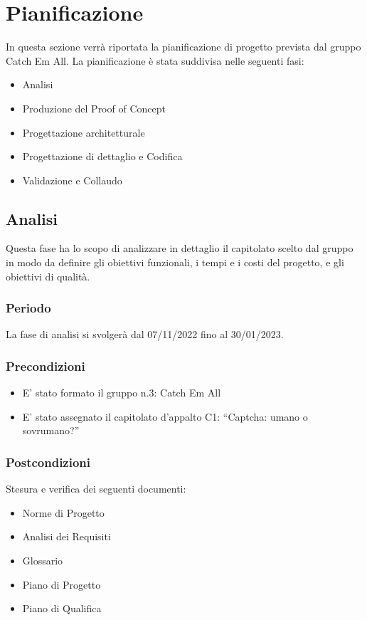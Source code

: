 \section{Pianificazione}
In questa sezione verrà riportata la pianificazione di progetto prevista dal gruppo Catch Em
All. La pianificazione è stata suddivisa nelle seguenti fasi:
\begin{itemize}
	\item Analisi
	\item Produzione del Proof of Concept
	\item Progettazione architetturale
    \item Progettazione di dettaglio e Codifica
	\item Validazione e Collaudo
\end{itemize}

\subsection{Analisi}
Questa fase ha lo scopo di analizzare in dettaglio il capitolato scelto dal gruppo in modo da
definire gli obiettivi funzionali, i tempi e i costi del progetto, e gli obiettivi di qualità.

\subsubsection{Periodo}
La fase di analisi si svolgerà dal 07/11/2022 fino al 30/01/2023.

\subsubsection{Precondizioni}
\begin{itemize}
	\item E’ stato formato il gruppo n.3: Catch Em All
	\item E’ stato assegnato il capitolato d’appalto C1: “Captcha: umano o sovrumano?”
\end{itemize}

\subsubsection{Postcondizioni}
Stesura e verifica dei seguenti documenti:
\begin{itemize}
	\item Norme di Progetto
	\item Analisi dei Requisiti
	\item Glossario
    \item Piano di Progetto
	\item Piano di Qualifica
\end{itemize}

